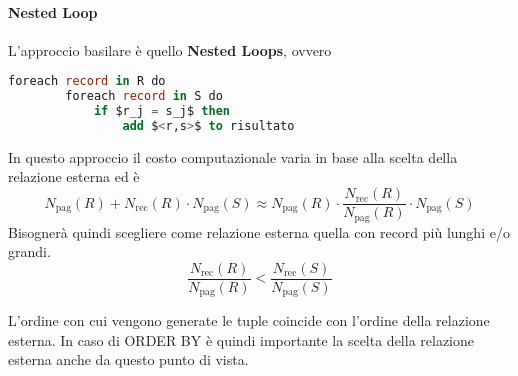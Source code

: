 \paragraph{Nested Loop}
L'approccio basilare è quello \textbf{Nested Loops}, ovvero
\begin{lstlisting}[language=SQL, mathescape]
	foreach record in R do
		foreach record in S do
			if $r_j = s_j$ then
				add $<r,s>$ to risultato
\end{lstlisting}
In questo approccio il costo computazionale varia in base alla scelta della relazione esterna ed è
\begin{equation}
	N_{\text{pag}}(R) + N_{\text{rec}}(R) \cdot N_{\text{pag}}(S) \approx N_{\text{pag}}(R) \cdot \frac{N_{\text{rec}}(R)}{N_{\text{pag}}(R)} \cdot N_{\text{pag}}(S)
\end{equation}
Bisognerà quindi scegliere come relazione esterna quella con record più lunghi e/o grandi.
\begin{equation*}
	\frac{N_{\text{rec}}(R)}{N_{\text{pag}}(R)} < \frac{N_{\text{rec}}(S)}{N_{\text{pag}}(S)}
\end{equation*}

\begin{note}
	L'ordine con cui vengono generate le tuple coincide con l'ordine della relazione esterna. In caso di ORDER BY è quindi importante la scelta della relazione esterna anche da questo punto di vista.
\end{note}

